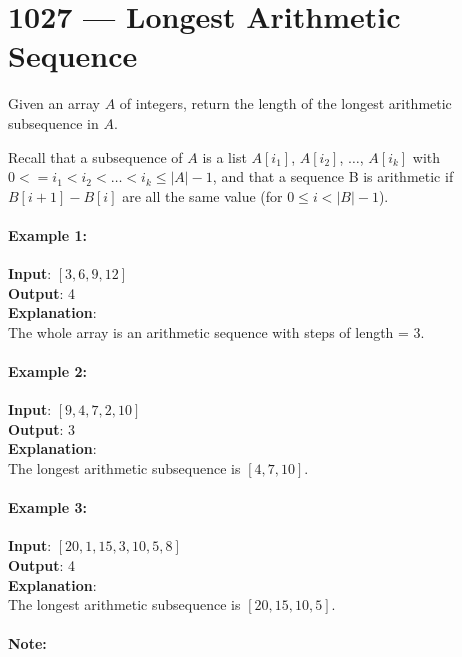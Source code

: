 \section{1027 --- Longest Arithmetic Sequence}
Given an array $ A $ of integers, return the length of the longest arithmetic subsequence in $ A $.
\par
Recall that a subsequence of $ A $ is a list $ A[i_1] $, $ A[i_2] $, $ \ldots $, $ A[i_k] $ with $0 <= i_1 < i_2 < \ldots < i_k \leq |A| - 1$, and that a sequence B is arithmetic if $B[i+1] - B[i]$ are all the same value (for $0 \leq i < |B| - 1$).

\paragraph{Example 1:}

\begin{flushleft}
\textbf{Input}: $[3,6,9,12]$
\\
\textbf{Output}: 4
\\
\textbf{Explanation}:
\\ 
The whole array is an arithmetic sequence with steps of length = 3.
\end{flushleft}


\paragraph{Example 2:}

\begin{flushleft}
\textbf{Input}: $[9,4,7,2,10]$
\\
\textbf{Output}: 3
\\
\textbf{Explanation}:
\\
The longest arithmetic subsequence is $[4,7,10]$.
\end{flushleft}

\paragraph{Example 3:}

\begin{flushleft}
\textbf{Input}: $[20,1,15,3,10,5,8]$
\\
\textbf{Output}: 4
\\
\textbf{Explanation}: 
\\
The longest arithmetic subsequence is $[20,15,10,5]$.
\end{flushleft}

\paragraph{Note:}

